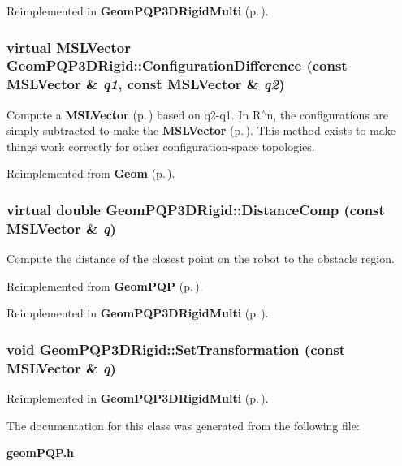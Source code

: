 Reimplemented in {\bf Geom\-PQP3DRigid\-Multi} {\rm (p.\,\pageref{class_GeomPQP3DRigidMulti_a2})}.
\subsubsection{\setlength{\rightskip}{0pt plus 5cm}virtual {\bf MSLVector} Geom\-PQP3DRigid::Configuration\-Difference (const {\bf MSLVector} \& {\em q1}, const {\bf MSLVector} \& {\em q2})\hspace{0.3cm}{\tt  [virtual]}}\label{class_GeomPQP3DRigid_a4}


Compute a {\bf MSLVector} {\rm (p.\,\pageref{class_MSLVector})} based on q2-q1. In R$^\wedge$n, the configurations are simply subtracted to make the {\bf MSLVector} {\rm (p.\,\pageref{class_MSLVector})}. This method exists to make things work correctly for other configuration-space topologies.



Reimplemented from {\bf Geom} {\rm (p.\,\pageref{class_Geom_a4})}.
\subsubsection{\setlength{\rightskip}{0pt plus 5cm}virtual double Geom\-PQP3DRigid::Distance\-Comp (const {\bf MSLVector} \& {\em q})\hspace{0.3cm}{\tt  [virtual]}}\label{class_GeomPQP3DRigid_a3}


Compute the distance of the closest point on the robot to the obstacle region.



Reimplemented from {\bf Geom\-PQP} {\rm (p.\,\pageref{class_GeomPQP_a5})}.

Reimplemented in {\bf Geom\-PQP3DRigid\-Multi} {\rm (p.\,\pageref{class_GeomPQP3DRigidMulti_a3})}.
\subsubsection{\setlength{\rightskip}{0pt plus 5cm}void Geom\-PQP3DRigid::Set\-Transformation (const {\bf MSLVector} \& {\em q})}\label{class_GeomPQP3DRigid_a5}




Reimplemented in {\bf Geom\-PQP3DRigid\-Multi} {\rm (p.\,\pageref{class_GeomPQP3DRigidMulti_a5})}.

The documentation for this class was generated from the following file:\begin{CompactItemize}
\item 
{\bf geom\-PQP.h}\end{CompactItemize}
